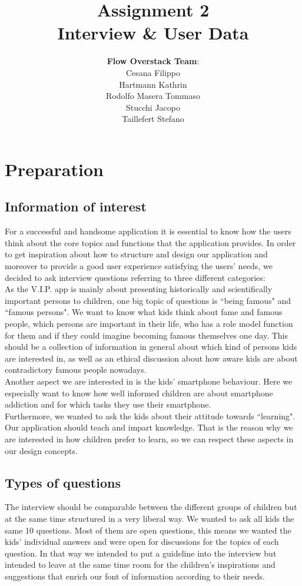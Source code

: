 \documentclass[12pt]{scrartcl}
\title{Assignment 2\\ Interview \& User Data}
\author{\textbf{Flow Overstack Team}:\\ Cesana Filippo\\ 	Hartmann Kathrin\\ Rodolfo Masera Tommaso\\ Stucchi Jacopo\\ Taillefert Stefano}
\date{}
\begin{document}
\maketitle


\section*{Preparation}
	\subsection*{Information of interest}
		For a successful and handsome application it is essential to know how the users think about the core topics and functions that the application provides. In order to get inspiration about how to structure and design our application and moreover to provide a good user experience satisfying the users' needs, we decided to ask interview questions referring to three different categories:\\
		
		As the V.I.P. app is mainly about presenting historically and scientifically important persons to children, one big topic of questions is ``being famous" and ``famous persons". We want to know what kids think about fame and famous people, which persons are important in their life, who has a role model function for them and if they could imagine becoming famous themselves one day. This should be a collection of information in general about which kind of persons kids are interested in, as well as an ethical discussion about how aware kids are about contradictory famous people nowadays.\\
		
		Another aspect we are interested in is the kids' smartphone behaviour. Here we especially want to know how well informed children are about smartphone addiction and for which tasks they use their smartphone.\\
		
		Furthermore, we wanted to ask the kids about their attitude towards ``learning". Our application should teach and impart knowledge. That is the reason why we are interested in how children prefer to learn, so we can respect these aspects in our design concepts.\\
		
	\subsection*{Types of questions}
		The interview should be comparable between the different groups of children but at the same time structured in a very liberal way. We wanted to ask all kids the same 10 questions. Most of them are open questions, this means we wanted the kids' individual answers and were open for discussions for the topics of each question. In that way we intended to put a guideline into the interview but intended to leave at the same time room for the children's inspirations and suggestions that enrich our font of information according to their needs.
\end{document}
